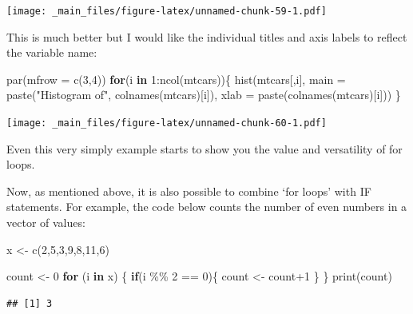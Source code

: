 \documentclass[
]{book}
\newenvironment{Shaded}{\begin{snugshade}}{\end{snugshade}}
\newcommand{\AttributeTok}[1]{\textcolor[rgb]{0.77,0.63,0.00}{#1}}
\newcommand{\ControlFlowTok}[1]{\textcolor[rgb]{0.13,0.29,0.53}{\textbf{#1}}}
\newcommand{\DecValTok}[1]{\textcolor[rgb]{0.00,0.00,0.81}{#1}}
\newcommand{\FunctionTok}[1]{\textcolor[rgb]{0.00,0.00,0.00}{#1}}
\newcommand{\NormalTok}[1]{#1}
\newcommand{\OtherTok}[1]{\textcolor[rgb]{0.56,0.35,0.01}{#1}}
\newcommand{\SpecialCharTok}[1]{\textcolor[rgb]{0.00,0.00,0.00}{#1}}
\newcommand{\StringTok}[1]{\textcolor[rgb]{0.31,0.60,0.02}{#1}}
\theoremstyle{definition}
\theoremstyle{definition}
\theoremstyle{definition}
\theoremstyle{definition}
\theoremstyle{remark}
\begin{document}
\texttt{[image: \_main\_files/figure-latex/unnamed-chunk-59-1.pdf]}

This is much better but I would like the individual titles and axis labels to reflect the variable name:

\begin{Shaded}
\begin{Highlighting}[]
\FunctionTok{par}\NormalTok{(}\AttributeTok{mfrow =} \FunctionTok{c}\NormalTok{(}\DecValTok{3}\NormalTok{,}\DecValTok{4}\NormalTok{))}
\ControlFlowTok{for}\NormalTok{(i }\ControlFlowTok{in} \DecValTok{1}\SpecialCharTok{:}\FunctionTok{ncol}\NormalTok{(mtcars))\{}
  \FunctionTok{hist}\NormalTok{(mtcars[,i], }\AttributeTok{main =} \FunctionTok{paste}\NormalTok{(}\StringTok{"Histogram of"}\NormalTok{, }\FunctionTok{colnames}\NormalTok{(mtcars)[i]), }\AttributeTok{xlab =} \FunctionTok{paste}\NormalTok{(}\FunctionTok{colnames}\NormalTok{(mtcars)[i]))}
\NormalTok{\}}
\end{Highlighting}
\end{Shaded}

\texttt{[image: \_main\_files/figure-latex/unnamed-chunk-60-1.pdf]}

Even this very simply example starts to show you the value and versatility of for loops.

Now, as mentioned above, it is also possible to combine `for loops' with IF statements. For example, the code below counts the number of even numbers in a vector of values:

\begin{Shaded}
\begin{Highlighting}[]
\NormalTok{x }\OtherTok{\textless{}{-}} \FunctionTok{c}\NormalTok{(}\DecValTok{2}\NormalTok{,}\DecValTok{5}\NormalTok{,}\DecValTok{3}\NormalTok{,}\DecValTok{9}\NormalTok{,}\DecValTok{8}\NormalTok{,}\DecValTok{11}\NormalTok{,}\DecValTok{6}\NormalTok{)}

\NormalTok{count }\OtherTok{\textless{}{-}} \DecValTok{0}
\ControlFlowTok{for}\NormalTok{ (i }\ControlFlowTok{in}\NormalTok{ x) \{}
  \ControlFlowTok{if}\NormalTok{(i }\SpecialCharTok{\%\%} \DecValTok{2} \SpecialCharTok{==} \DecValTok{0}\NormalTok{)\{}
\NormalTok{    count }\OtherTok{\textless{}{-}}\NormalTok{ count}\SpecialCharTok{+}\DecValTok{1}
\NormalTok{  \}}
\NormalTok{\}}
\FunctionTok{print}\NormalTok{(count)}
\end{Highlighting}
\end{Shaded}

\begin{verbatim}
## [1] 3
\end{verbatim}
\end{document}
